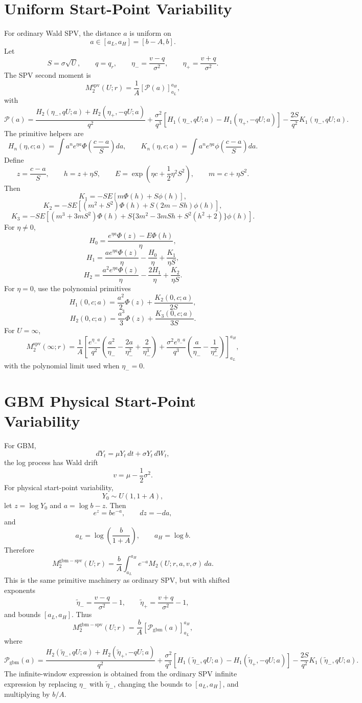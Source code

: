 \documentclass[11pt]{article}
\begin{document}
\section{Uniform Start-Point Variability}

For ordinary Wald SPV, the distance $a$ is uniform on
\[
a\in[a_L,a_H]=[b-A,b].
\]
Let
\[
S=\sigma\sqrt U,
\qquad
q=q_r,
\qquad
\eta_- = \frac{v-q}{\sigma^2},
\qquad
\eta_+ = \frac{v+q}{\sigma^2}.
\]
The SPV second moment is
\[
M^{\mathrm{spv}}_2(U;r)=
\frac{1}{A}\left[\mathcal P(a)\right]_{a_L}^{a_H},
\]
with
\[
\mathcal P(a)=
\frac{H_2(\eta_-,qU;a)+H_2(\eta_+,-qU;a)}{q^2}
+
\frac{\sigma^2}{q^3}\left[H_1(\eta_-,qU;a)-H_1(\eta_+,-qU;a)\right]
-
\frac{2S}{q^2}K_1(\eta_-,qU;a).
\]
The primitive helpers are
\[
H_n(\eta,c;a)=\int a^n e^{\eta a}\Phi\left(\frac{c-a}{S}\right)da,
\qquad
K_n(\eta,c;a)=\int a^n e^{\eta a}\phi\left(\frac{c-a}{S}\right)da.
\]
Define
\[
z=\frac{c-a}{S},
\qquad
h=z+\eta S,
\qquad
E=\exp\left(\eta c+\frac12\eta^2S^2\right),
\qquad
m=c+\eta S^2.
\]
Then
\[
K_1=-SE\left[m\Phi(h)+S\phi(h)\right],
\]
\[
K_2=-SE\left[(m^2+S^2)\Phi(h)+S(2m-Sh)\phi(h)\right],
\]
\[
K_3=-SE\left[(m^3+3mS^2)\Phi(h)+S\{3m^2-3mSh+S^2(h^2+2)\}\phi(h)\right].
\]
For $\eta\ne0$,
\[
H_0=\frac{e^{\eta a}\Phi(z)-E\Phi(h)}{\eta},
\]
\[
H_1=\frac{ae^{\eta a}\Phi(z)}{\eta}-\frac{H_0}{\eta}+\frac{K_1}{\eta S},
\]
\[
H_2=\frac{a^2e^{\eta a}\Phi(z)}{\eta}-\frac{2H_1}{\eta}+\frac{K_2}{\eta S}.
\]
For $\eta=0$, use the polynomial primitives
\[
H_1(0,c;a)=\frac{a^2}{2}\Phi(z)+\frac{K_2(0,c;a)}{2S},
\]
\[
H_2(0,c;a)=\frac{a^3}{3}\Phi(z)+\frac{K_3(0,c;a)}{3S}.
\]
For $U=\infty$,
\[
M^{\mathrm{spv}}_2(\infty;r)=
\frac{1}{A}\left[
\frac{e^{\eta_-a}}{q^2}
\left(\frac{a^2}{\eta_-}-\frac{2a}{\eta_-^2}+\frac{2}{\eta_-^3}\right)
+
\frac{\sigma^2e^{\eta_-a}}{q^3}
\left(\frac{a}{\eta_-}-\frac{1}{\eta_-^2}\right)
\right]_{a_L}^{a_H},
\]
with the polynomial limit used when $\eta_-=0$.

\section{GBM Physical Start-Point Variability}

For GBM,
\[
dY_t=\mu Y_t\,dt+\sigma Y_t\,dW_t,
\]
the log process has Wald drift
\[
v=\mu-\frac12\sigma^2.
\]
For physical start-point variability,
\[
Y_0\sim U(1,1+A),
\]
let $z=\log Y_0$ and $a=\log b-z$. Then
\[
e^z=be^{-a},
\qquad
dz=-da,
\]
and
\[
a_L=\log\left(\frac{b}{1+A}\right),
\qquad
a_H=\log b.
\]
Therefore
\[
M^{\mathrm{gbm-spv}}_2(U;r)=
\frac{b}{A}\int_{a_L}^{a_H}e^{-a}M_2(U;r,a,v,\sigma)\,da.
\]
This is the same primitive machinery as ordinary SPV, but with shifted exponents
\[
\tilde\eta_- = \frac{v-q}{\sigma^2}-1,
\qquad
\tilde\eta_+ = \frac{v+q}{\sigma^2}-1,
\]
and bounds $[a_L,a_H]$. Thus
\[
M^{\mathrm{gbm-spv}}_2(U;r)=
\frac{b}{A}\left[\mathcal P_{\mathrm{gbm}}(a)\right]_{a_L}^{a_H},
\]
where
\[
\mathcal P_{\mathrm{gbm}}(a)=
\frac{H_2(\tilde\eta_-,qU;a)+H_2(\tilde\eta_+,-qU;a)}{q^2}
+
\frac{\sigma^2}{q^3}\left[H_1(\tilde\eta_-,qU;a)-H_1(\tilde\eta_+,-qU;a)\right]
-
\frac{2S}{q^2}K_1(\tilde\eta_-,qU;a).
\]
The infinite-window expression is obtained from the ordinary SPV infinite expression by replacing $\eta_-$ with $\tilde\eta_-$, changing the bounds to $[a_L,a_H]$, and multiplying by $b/A$.
\end{document}
